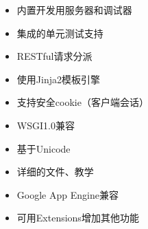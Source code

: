 \begin{itemize}
  \item 内置开发用服务器和调试器
  \item 集成的单元测试支持
  \item RESTful请求分派
  \item 使用Jinja2模板引擎
  \item 支持安全cookie（客户端会话）
  \item WSGI1.0兼容
  \item 基于Unicode
  \item 详细的文件、教学
  \item Google App Engine兼容
  \item 可用Extensions增加其他功能
\end{itemize}



